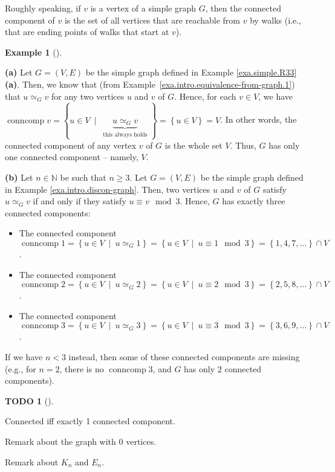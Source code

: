 \documentclass[numbers=enddot,12pt,final,onecolumn,notitlepage]{scrartcl}%
\theoremstyle{definition}
\newtheorem{exam}[theo]{Example}
\newenvironment{example}[1][]
{\begin{exam}[#1]\begin{leftbar}}
{\end{leftbar}\end{exam}}
\newtheorem{quest}[theo]{TODO}
\newenvironment{todo}[1][]
{\begin{quest}[#1]\begin{leftbar}}
{\end{leftbar}\end{quest}}
\newcommand{\conncomp}{\operatorname{conncomp}}
\newcommand{\NN}{\mathbb{N}}
\newcommand{\set}[1]{\left\{ #1 \right\}}
\newcommand{\tup}[1]{\left( #1 \right)}
\newcommand{\underbrack}[2]{\underbrace{#1}_{\substack{#2}}}
\begin{document}
Roughly speaking, if $v$ is a vertex of a simple graph $G$, then
the connected component of $v$ is the set of all vertices that are
reachable from $v$ by walks (i.e., that are ending points of walks
that start at $v$).

\begin{example}
\textbf{(a)} Let $G = \tup{V, E}$ be the simple graph defined in
Example \ref{exa.simple.R33} \textbf{(a)}.
Then, we know that (from
Example~\ref{exa.intro.equivalence-from-graph.1}) that
$u \simeq_G v$ for any two vertices $u$ and $v$ of $G$.
Hence, for each $v \in V$, we have
$\conncomp v
= \set{ u \in V \ \mid \  \underbrack{u \simeq_G v}
                                     {\text{this always holds}} }
= \set{ u \in V } = V$.
In other words, the connected component of any vertex $v$
of $G$ is the whole set $V$.
Thus, $G$ has only one connected component -- namely, $V$.

\textbf{(b)} Let $n \in \NN$ be such that $n \geq 3$.
Let $G = \tup{V, E}$ be the simple graph defined in
Example \ref{exa.intro.discon-graph}.
Then, two vertices $u$ and $v$ of $G$ satisfy
$u \simeq_G v$ if and only if they satisfy
$u \equiv v \mod 3$.
Hence, $G$ has exactly three connected components:
\begin{itemize}
\item The connected component
      $\conncomp 1
       = \set{ u \in V \ \mid \  u \simeq_G 1 }
       = \set{ u \in V \ \mid \  u \equiv 1 \mod 3 }
       = \set{1, 4, 7, \ldots} \cap V$.
\item The connected component
      $\conncomp 2
       = \set{ u \in V \ \mid \  u \simeq_G 2 }
       = \set{ u \in V \ \mid \  u \equiv 2 \mod 3 }
       = \set{2, 5, 8, \ldots} \cap V$.
\item The connected component
      $\conncomp 3
       = \set{ u \in V \ \mid \  u \simeq_G 3 }
       = \set{ u \in V \ \mid \  u \equiv 3 \mod 3 }
       = \set{3, 6, 9, \ldots} \cap V$.
\end{itemize}
If we have $n < 3$ instead, then some of these
connected components are missing (e.g., for $n = 2$,
there is no $\conncomp 3$, and $G$ has only $2$
connected components).
\end{example}

\begin{todo}
Connected iff exactly 1 connected component.

Remark about the graph with $0$ vertices.

Remark about $K_n$ and $E_n$.
\end{todo}
\end{document}
